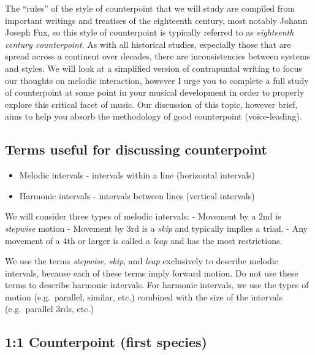 \documentclass{book}
\providecommand{\tightlist}{%
  \setlength{\itemsep}{0pt}\setlength{\parskip}{0pt}}
\begin{document}
The ``rules'' of the style of counterpoint that we will study are compiled
from important writings and treatises of the eighteenth century, most notably
Johann Joseph Fux, so this style of counterpoint is typically referred to as
\emph{eighteenth century counterpoint}. As with all historical studies,
especially those that are spread across a continent over decades, there are
inconsistencies between systems and styles. We will look at a simplified
version of contrapuntal writing to focus our thoughts on melodic interaction,
however I urge you to complete a full study of counterpoint at some point in
your musical development in order to properly explore this critical facet of
music. Our discussion of this topic, however brief, aims to help you absorb
the methodology of good counterpoint (voice-leading).

\hypertarget{terms-useful-for-discussing-counterpoint}{%
\subsection{Terms useful for discussing
counterpoint}\label{terms-useful-for-discussing-counterpoint}}

\begin{itemize}
\tightlist
\item
  Melodic intervals - intervals within a line (horizontal intervals)
\item
  Harmonic intervals - intervals between lines (vertical intervals)
\end{itemize}

We will consider three types of melodic intervals: - Movement by a 2nd is
\emph{stepwise} motion - Movement by 3rd is a \emph{skip} and typically
implies a triad. - Any movement of a 4th or larger is called a \emph{leap} and
has the most restrictions.

We use the terms \emph{stepwise}, \emph{skip}, and \emph{leap} exclusively to
describe melodic intervals, because each of these terms imply forward motion.
Do not use these terms to describe harmonic intervals. For harmonic intervals,
we use the types of motion (e.g.~parallel, similar, etc.) combined with the
size of the intervals (e.g.~parallel 3rds, etc.)

\hypertarget{counterpoint-first-species}{%
\subsection{1:1 Counterpoint (first
species)}\label{counterpoint-first-species}}
\end{document}
